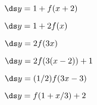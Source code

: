 \begin{exercises}

\begin{exercise} $\ds y=1+f(x+2)$\end{exercise}
\begin{exercise} $\ds y=1+2f(x)$\end{exercise}
\begin{exercise} $\ds y=2f(3x)$\end{exercise}
\begin{exercise} $\ds y=2f(3(x-2))+1$\end{exercise}
\begin{exercise} $\ds y=(1/2)f(3x-3)$\end{exercise}
\begin{exercise} $\ds y=f(1+x/3)+2$\end{exercise}

\end{exercises}
